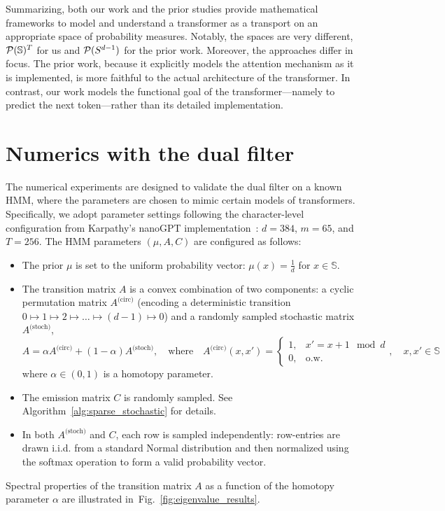 \documentclass[twoside,11pt]{article}
\def\Fig#1{Fig.~\ref{#1}}
\def\clP{{\cal P}}
\def\Fig#1{Fig.~\ref{#1}}
\def\bS{\begin{slide}}
\def\clP{{\cal P}}
\def\clP{{\cal P}}
\def\bS{\mathbb{S}}
\begin{document}
Summarizing, both our work and the prior studies provide mathematical
frameworks to model and understand a transformer as a transport on an
appropriate 
space of probability measures. Notably, the spaces are very different,
$\clP(\bS)^T$ for us and $\clP(S^{d-1})$ for the prior work. 
Moreover, the approaches differ in
focus.  The
prior work, because it explicitly models the attention mechanism as
it is implemented, is more faithful to the actual architecture of the
transformer. In contrast, our work models the functional goal of
the transformer---namely to predict the next token---rather than its
detailed implementation.


\section{Numerics with the dual filter}
\label{sec:numerics}

The numerical experiments are designed to validate the dual filter on
a known HMM, where the parameters are chosen to mimic certain models
of transformers.  Specifically, we adopt parameter
settings following the character-level configuration from Karpathy's nanoGPT
implementation~\citep{Karpathy2022}: $d = 384$, $m = 65$, and $T =
256$. 
The HMM parameters $(\mu, A, C)$ are configured as follows:
\begin{itemize}
  \item The prior $\mu$ is set to the uniform probability vector: $
\mu(x) = \frac{1}{d}$ for $x\in\bS$.
  \item The transition matrix $A$ is a convex
    combination of two components: a cyclic permutation matrix 
    $A^\text{(circ)}$ (encoding a deterministic transition $0\mapsto 1 \mapsto 2 \mapsto
    \hdots \mapsto (d-1) \mapsto 0$) and a randomly sampled 
    stochastic matrix $A^\text{(stoch)}$,
  \begin{equation*}
    A = \alpha A^\text{(circ)} + (1-\alpha) A^\text{(stoch)},\quad \text{where} \quad
    A^\text{(circ)}(x,x') = \begin{cases}
      1, & x'= x+1 \mod d \\
      0, & \text{o.w.}
    \end{cases},\quad x,x'\in\bS
  \end{equation*}
  where $\alpha\in (0,1)$ is a homotopy parameter. 
\item The emission matrix $C$ is randomly sampled. See Algorithm~\ref{alg:sparse_stochastic} for details.
  \item In both $A^{\text{(stoch)}}$ and $C$, each row is sampled
    independently: row-entries are drawn i.i.d. from a standard Normal
    distribution and then normalized using the softmax operation to
    form a valid probability vector. 
  \end{itemize}
Spectral properties of the transition matrix $A$ as a function of the
homotopy parameter $\alpha$ are illustrated
in~\Fig{fig:eigenvalue_results}.
\end{document}
